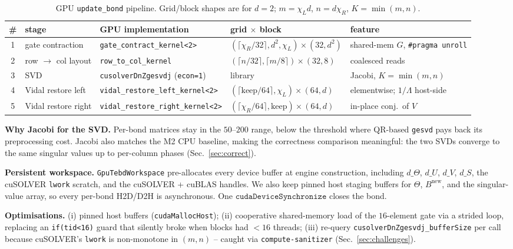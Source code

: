 \documentclass[11pt]{article}
\begin{document}
\begin{table}[h]
\centering
\caption{GPU \texttt{update\_bond} pipeline. Grid/block shapes are for
$d{=}2$; $m=\chi_L d$, $n=d\chi_R$, $K=\min(m,n)$.}
\label{tab:kernels}
\footnotesize
\setlength{\tabcolsep}{4pt}
\begin{tabular}{@{}c l l l l@{}}
\toprule
\# & stage & GPU implementation & grid $\times$ block & feature \\
\midrule
1 & gate contraction
  & \texttt{gate\_contract\_kernel<2>}
  & $(\lceil\chi_R/32\rceil, d^2, \chi_L)\!\times\!(32, d^2)$
  & shared-mem $G$, \texttt{\#pragma unroll}\\
2 & row $\to$ col layout
  & \texttt{row\_to\_col\_kernel}
  & $(\lceil n/32\rceil, \lceil m/8\rceil)\!\times\!(32,8)$
  & coalesced reads \\
3 & SVD
  & \texttt{cusolverDnZgesvdj} (\texttt{econ=1})
  & library
  & Jacobi, $K{=}\min(m,n)$ \\
4 & Vidal restore left
  & \texttt{vidal\_restore\_left\_kernel<2>}
  & $(\lceil\mathrm{keep}/64\rceil, \chi_L)\!\times\!(64, d)$
  & elementwise; $1/\Lambda$ host-side \\
5 & Vidal restore right
  & \texttt{vidal\_restore\_right\_kernel<2>}
  & $(\lceil\chi_R/64\rceil, \mathrm{keep})\!\times\!(64, d)$
  & in-place conj.\ of $V$ \\
\bottomrule
\end{tabular}
\end{table}

\textbf{Why Jacobi for the SVD.} Per-bond matrices stay in the $50$--$200$
range, below the threshold where QR-based \texttt{gesvd} pays back its
preprocessing cost. Jacobi also matches the M2 CPU baseline, making the
correctness comparison meaningful: the two SVDs converge to the same
singular values up to per-column phases (Sec.~\ref{sec:correct}).

\textbf{Persistent workspace.}
\texttt{GpuTebdWorkspace} pre-allocates every device buffer at engine
construction, including $d\_\Theta$, $d\_U$, $d\_V$, $d\_S$, the cuSOLVER
\texttt{lwork} scratch, and the cuSOLVER + cuBLAS handles. We also keep
pinned host staging buffers for $\Theta$, $B^{\text{new}}$, and the
singular-value array, so every per-bond H2D/D2H is asynchronous. One
$\mathtt{cudaDeviceSynchronize}$ closes the bond.

\textbf{Optimisations.} (i) pinned host buffers
(\texttt{cudaMallocHost}); (ii) cooperative shared-memory load of the
$16$-element gate via a strided loop, replacing an
\texttt{if(tid<16)} guard that silently broke when blocks had $<\!16$
threads; (iii) re-query
\texttt{cusolverDnZgesvdj\_bufferSize} per call because cuSOLVER's
\texttt{lwork} is non-monotone in $(m,n)$ -- caught via
\texttt{compute-sanitizer} (Sec.~\ref{sec:challenges}).
\end{document}
